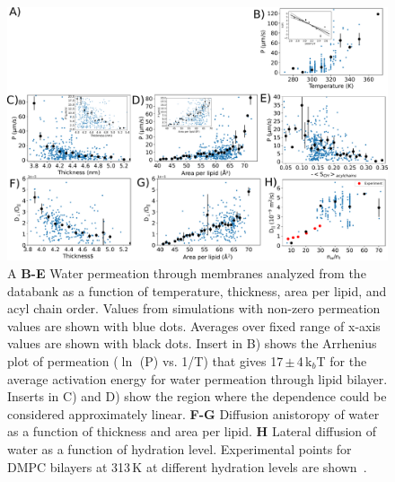 \documentclass[fleqn,10pt]{wlscirep}
\begin{document}
\begin{figure}[tb]
    \centering
    \includegraphics[width=180mm]{Figures/permeation2.pdf}
    \caption{A 
    {\bf B-E} Water permeation through membranes analyzed from the databank as a function of temperature, thickness, area per lipid, and acyl chain order. Values from simulations with non-zero permeation values are shown with blue dots. Averages over fixed range of x-axis values are shown with black dots. Insert in B) shows the Arrhenius plot of permeation ($\ln$ (P) vs. 1/T) that gives 17\,$\pm$\,4\,k$_b$T for the average activation energy for water permeation through lipid bilayer. Inserts in C) and D) show the region where the dependence could be considered approximately linear.
    {\bf F-G} Diffusion anistoropy of water as a function of thickness and area per lipid.
    {\bf H} Lateral diffusion of water as a function of hydration level. Experimental points for DMPC bilayers at 313\,K at different hydration levels are shown~\cite{rudakova04}.}
    \label{fig:permeability}
\end{figure}
\end{document}
